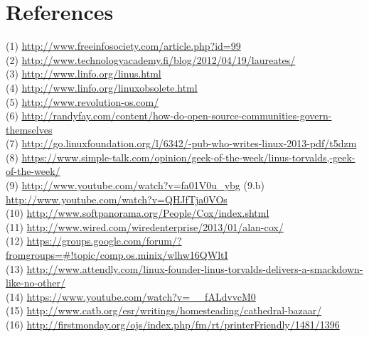 \documentclass[11pt]{article}
\begin{document}
\pagebreak

\section{References}
(1) \url{http://www.freeinfosociety.com/article.php?id=99}
\\
(2) \url{http://www.technologyacademy.fi/blog/2012/04/19/laureates/}
\\
(3) \url{http://www.linfo.org/linus.html}
\\
(4) \url{http://www.linfo.org/linuxobsolete.html}
\\
(5) \url{http://www.revolution-os.com/}
\\
(6) \url{http://randyfay.com/content/how-do-open-source-communities-govern-themselves}
\\
(7) \url{http://go.linuxfoundation.org/l/6342/-pub-who-writes-linux-2013-pdf/t5dzm}
\\
(8) \url{https://www.simple-talk.com/opinion/geek-of-the-week/linus-torvalds,-geek-of-the-week/}
\\
(9) \url{http://www.youtube.com/watch?v=fa01V0u_ybg}
(9.b) \url{http://www.youtube.com/watch?v=QHJfTja0VOs}
\\
(10) \url{http://www.softpanorama.org/People/Cox/index.shtml}
\\
(11) \url{http://www.wired.com/wiredenterprise/2013/01/alan-cox/}
\\
(12) \url{https://groups.google.com/forum/?fromgroups=#!topic/comp.os.minix/wlhw16QWltI}
\\
(13) \url{http://www.attendly.com/linux-founder-linus-torvalds-delivers-a-smackdown-like-no-other/}
\\
(14) \url{https://www.youtube.com/watch?v=__fALdvvcM0}
\\
(15) \url{http://www.catb.org/esr/writings/homesteading/cathedral-bazaar/}
\\
(16) \url{http://firstmonday.org/ojs/index.php/fm/rt/printerFriendly/1481/1396}
\end{document}
